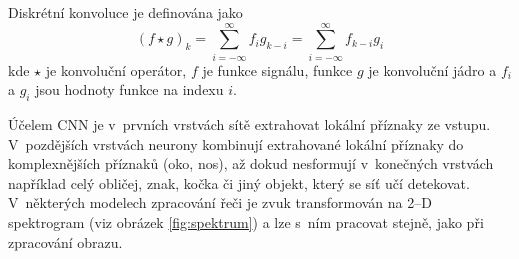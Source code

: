 Diskrétní konvoluce je definována jako
\begin{equation}
   (f \star g)_k = \sum_{i=-\infty}^{\infty} f_i g_{k-i} = \sum_{i=-\infty}^{\infty} f_{k-i} g_{i}
\end{equation}
kde $\star$ je konvoluční operátor, $f$ je funkce signálu, funkce $g$ je konvoluční jádro a $f_i$ a $g_i$ jsou hodnoty funkce na indexu $i$.


Účelem CNN je v~prvních vrstvách sítě extrahovat lokální příznaky ze vstupu. V~pozdějších vrstvách neurony kombinují extrahované lokální příznaky do komplexnějších příznaků (oko, nos), až dokud nesformují v~konečných vrstvách například celý obličej, znak, kočka či jiný objekt, který se síť učí detekovat. V~některých modelech zpracování řeči je zvuk transformován na 2--D spektrogram (viz obrázek \ref{fig:spektrum}) a lze s~ním pracovat stejně, jako při zpracování obrazu.






